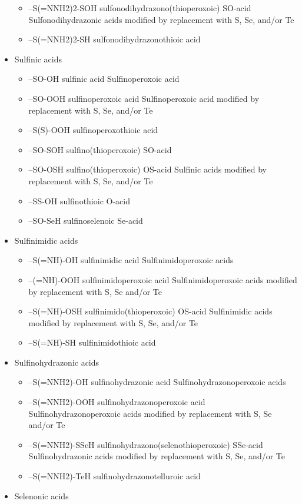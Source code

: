 \documentclass[a4paper,12pt]{report}
\begin{document}
\begin{itemize}
\begin{itemize}
\item –S(=NNH2)2-SOH sulfonodihydrazono(thioperoxoic) SO-acid Sulfonodihydrazonic acids modified by replacement with S, Se, and/or Te 
\item –S(=NNH2)2-SH sulfonodihydrazonothioic acid 
\end{itemize}
\item Sulfinic acids 
\begin{itemize}
\item –SO-OH sulfinic acid Sulfinoperoxoic acid 
\item –SO-OOH sulfinoperoxoic acid Sulfinoperoxoic acid modified by replacement with S, Se, and/or Te 
\item –S(S)-OOH sulfinoperoxothioic acid 
\item –SO-SOH sulfino(thioperoxoic) SO-acid 
\item –SO-OSH sulfino(thioperoxoic) OS-acid Sulfinic acids modified by replacement with S, Se, and/or Te 
\item –SS-OH sulfinothioic O-acid 
\item –SO-SeH sulfinoselenoic Se-acid 
\end{itemize}
\item Sulfinimidic acids 
\begin{itemize}
\item –S(=NH)-OH sulfinimidic acid Sulfinimidoperoxoic acids 
\item –(=NH)-OOH sulfinimidoperoxoic acid Sulfinimidoperoxoic acids modified by replacement with S, Se and/or Te 
\item –S(=NH)-OSH sulfinimido(thioperoxoic) OS-acid Sulfinimidic acids modified by replacement with S, Se, and/or Te 
\item –S(=NH)-SH sulfinimidothioic acid 
\end{itemize}
\item Sulfinohydrazonic acids 
\begin{itemize}
\item –S(=NNH2)-OH sulfinohydrazonic acid Sulfinohydrazonoperoxoic acids 
\item –S(=NNH2)-OOH sulfinohydrazonoperoxoic acid Sulfinohydrazonoperoxoic acids modified by replacement with S, Se and/or Te 
\item –S(=NNH2)-SSeH sulfinohydrazono(selenothioperoxoic) SSe-acid Sulfinohydrazonic acids modified by replacement with S, Se, and/or Te 
\item –S(=NNH2)-TeH sulfinohydrazonotelluroic acid 
\end{itemize}
\item Selenonic acids 

\end{itemize}
\end{document}
